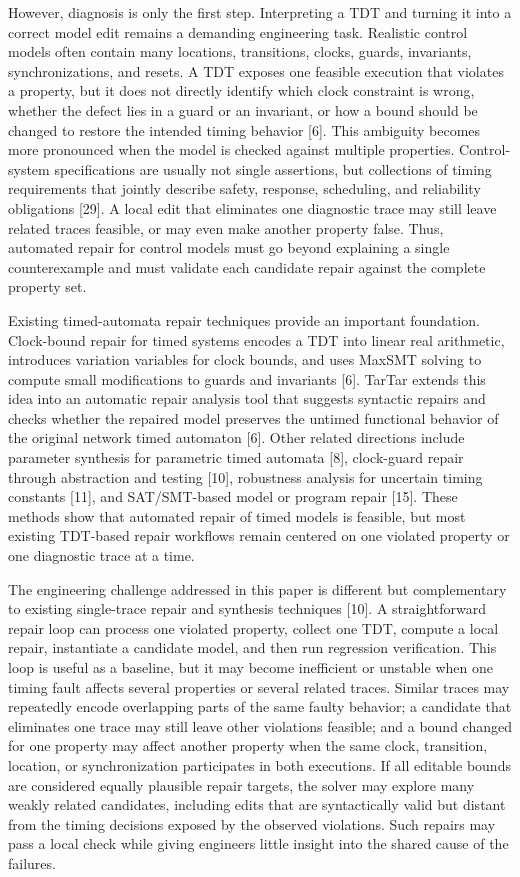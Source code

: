 \documentclass[
]{article}
\begin{document}
However, diagnosis is only the first step. Interpreting a TDT and
turning it into a correct model edit remains a demanding engineering
task. Realistic control models often contain many locations,
transitions, clocks, guards, invariants, synchronizations, and resets. A
TDT exposes one feasible execution that violates a property, but it does
not directly identify which clock constraint is wrong, whether the
defect lies in a guard or an invariant, or how a bound should be changed
to restore the intended timing behavior {[}6{]}. This ambiguity becomes
more pronounced when the model is checked against multiple properties.
Control-system specifications are usually not single assertions, but
collections of timing requirements that jointly describe safety,
response, scheduling, and reliability obligations {[}29{]}. A local edit
that eliminates one diagnostic trace may still leave related traces
feasible, or may even make another property false. Thus, automated
repair for control models must go beyond explaining a single
counterexample and must validate each candidate repair against the
complete property set.

Existing timed-automata repair techniques provide an important
foundation. Clock-bound repair for timed systems encodes a TDT into
linear real arithmetic, introduces variation variables for clock bounds,
and uses MaxSMT solving to compute small modifications to guards and
invariants {[}6{]}. TarTar extends this idea into an automatic repair
analysis tool that suggests syntactic repairs and checks whether the
repaired model preserves the untimed functional behavior of the original
network timed automaton {[}6{]}. Other related directions include
parameter synthesis for parametric timed automata {[}8{]}, clock-guard
repair through abstraction and testing {[}10{]}, robustness analysis for
uncertain timing constants {[}11{]}, and SAT/SMT-based model or program
repair {[}15{]}. These methods show that automated repair of timed
models is feasible, but most existing TDT-based repair workflows remain
centered on one violated property or one diagnostic trace at a time.

The engineering challenge addressed in this paper is different but
complementary to existing single-trace repair and synthesis techniques
{[}10{]}. A straightforward repair loop can process one violated
property, collect one TDT, compute a local repair, instantiate a
candidate model, and then run regression verification. This loop is
useful as a baseline, but it may become inefficient or unstable when one
timing fault affects several properties or several related traces.
Similar traces may repeatedly encode overlapping parts of the same
faulty behavior; a candidate that eliminates one trace may still leave
other violations feasible; and a bound changed for one property may
affect another property when the same clock, transition, location, or
synchronization participates in both executions. If all editable bounds
are considered equally plausible repair targets, the solver may explore
many weakly related candidates, including edits that are syntactically
valid but distant from the timing decisions exposed by the observed
violations. Such repairs may pass a local check while giving engineers
little insight into the shared cause of the failures.
\end{document}
